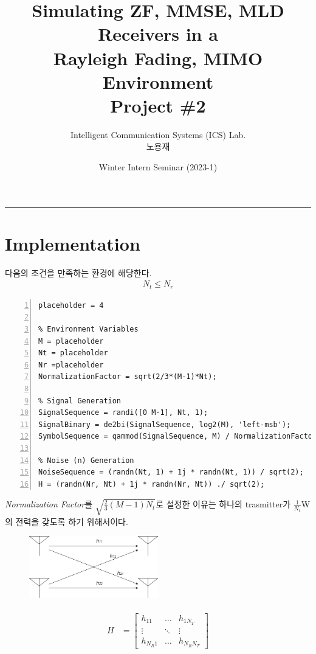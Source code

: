 \documentclass{article}
\title{Simulating ZF, MMSE, MLD Receivers in a \\Rayleigh Fading, MIMO Environment\\
\large Project \#2}
\author{Intelligent Communication Systems (ICS) Lab.\\노용재}
\date{Winter Intern Seminar (2023-1)}
\begin{document}
\maketitle
\tableofcontents
\vspace{0.5cm}
\hrule
\vspace{0.5cm}

\section{Implementation}
다음의 조건을 만족하는 환경에 해당한다.
\begin{gather}
N_t \leq N_r
\end{gather}
\begin{lstlisting}[style=Matlab-editor, frame=single, numbers=left,]
placeholder = 4

% Environment Variables
M = placeholder
Nt = placeholder
Nr =placeholder
NormalizationFactor = sqrt(2/3*(M-1)*Nt);

% Signal Generation
SignalSequence = randi([0 M-1], Nt, 1);
SignalBinary = de2bi(SignalSequence, log2(M), 'left-msb');
SymbolSequence = qammod(SignalSequence, M) / NormalizationFactor;

% Noise (n) Generation
NoiseSequence = (randn(Nt, 1) + 1j * randn(Nt, 1)) / sqrt(2);
H = (randn(Nr, Nt) + 1j * randn(Nr, Nt)) ./ sqrt(2);
\end{lstlisting}
\textsl{Normalization Factor}를 $\sqrt{\frac{2}{3}(M-1)N_t}$로 설정한 이유는 하나의 trasmitter가 $\frac{1}{N_t}$W의 전력을 갖도록 하기 위해서이다.\\
\begin{figure}[H]
	\centerline{\includegraphics[width=0.5\textwidth]{antenna.png}}
	\caption{}
\end{figure}
\begin{gather}
	\begin{split}
		H &=
		\begin{bmatrix}
		h_{11} & \hdots & h_{1N_T}\\
		\vdots & \ddots & \vdots\\
		h_{N_R1} & \hdots & h_{N_R N_T}
		\end{bmatrix}
	\end{split}
\end{gather}
\end{document}
